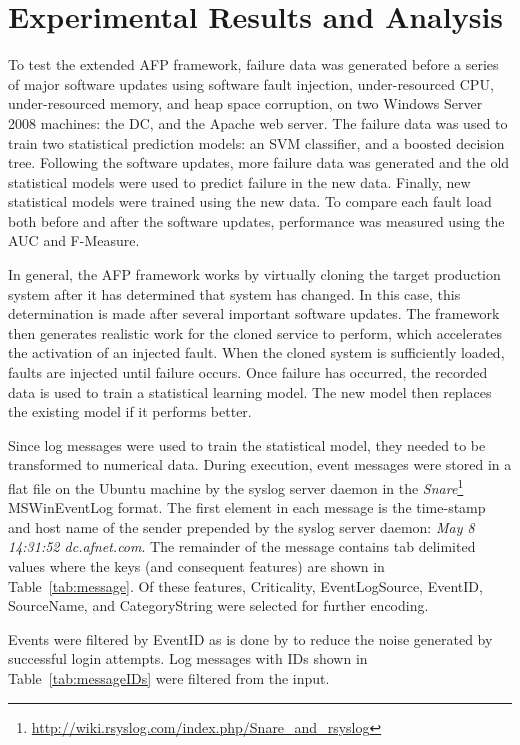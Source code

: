 \section{Experimental Results and Analysis} \label{chapter4}
To test the extended \ac{AFP} framework, failure data was generated before a
series of major software updates using software fault injection,
under-resourced \ac{CPU}, under-resourced memory, and heap space corruption, on
two Windows Server 2008 machines: the \ac{DC}, and the Apache web server.  The
failure data was used to train two statistical prediction models: an \ac{SVM}
classifier, and a boosted decision tree.  Following the software updates, more
failure data was generated and the old statistical models were used to predict
failure in the new data.  Finally, new statistical models were trained using
the new data.  To compare each fault load both before and after the software
updates, performance was measured using the \ac{AUC} and F-Measure.

In general, the \ac{AFP} framework works by virtually cloning the target
production system after it has determined that system has changed.  In this
case, this determination is made after several important software updates.  The
framework then generates realistic work for the cloned service to perform,
which accelerates the activation of an injected fault.  When the cloned system
is sufficiently loaded, faults are injected until failure occurs.  Once failure
has occurred, the recorded data is used to train a statistical learning model.
The new model then replaces the existing model if it performs better.

Since log messages were used to train the statistical model, they needed to be
transformed to numerical data.  During execution, event messages were stored in
a flat file on the Ubuntu machine by the syslog server daemon in the
\emph{Snare}\footnote{\url{http://wiki.rsyslog.com/index.php/Snare\_and\_rsyslog}}
MSWinEventLog format.  The first element in each message is the time-stamp and
host name of the sender prepended by the syslog server daemon: \emph{May 8
14:31:52 dc.afnet.com}.  The remainder of the message contains tab delimited
values where the keys (and consequent features) are shown in
Table~\ref{tab:message}.  Of these features, Criticality, EventLogSource,
EventID, SourceName, and CategoryString were selected for further encoding.

\tabMessage

Events were filtered by EventID as is done by \citet{fulp2008} to reduce the
noise generated by successful login attempts.  Log messages with IDs shown in
Table~\ref{tab:messageIDs} were filtered from the input.  

